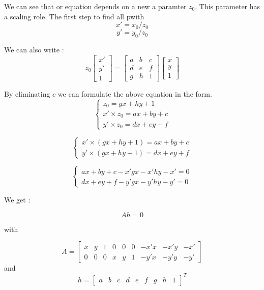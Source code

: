 \documentclass{article}
\begin{document}
 We can see that or equation depends on a new a paramter $z_0$. This parameter has a scaling role. The first step to find all pwith 
$$ x' = x_0 / z_0 $$
$$ y' = y_0 / z_0 $$

We can also write :
$$ z_0 \begin{bmatrix} x' \\ y' \\ 1 \end{bmatrix} = \begin{bmatrix} a & b & c \\ d & e & f \\ g & h & 1 \end{bmatrix} \begin{bmatrix} x \\ y \\ 1 \end{bmatrix} $$

By eliminating $c$ we can formulate the above equation in the form.
\begin{equation}
\left\lbrace
\begin{array}{ccc}
z_0 = gx + hy + 1 \\
x' \times z_0 = ax + by + c \\
y' \times z_0 = dx + ey + f
\end{array}\right.
\end{equation}

\begin{equation}
\left\lbrace
\begin{array}{ccc}
x' \times (gx + hy + 1) = ax + by + c \\
y' \times (gx + hy + 1) = dx + ey + f
\end{array}\right.
\end{equation}

\begin{equation}
\left\lbrace
\begin{array}{ccc}
ax + by + c  -  x'gx - x'hy - x' = 0\\
dx + ey + f - y'gx - y'hy - y' = 0
\end{array}\right.
\end{equation}

We get :

$$Ah = 0$$

with

$$ A = \begin{bmatrix} x & y & 1 & 0 & 0 & 0 & -x'x & -x'y & -x'  \\ 0 & 0 & 0 & x & y & 1 & -y'x & -y'y & -y' \end{bmatrix} $$
and
$$ h = \begin{bmatrix} a & b & c & d & e & f & g & h & 1  \end{bmatrix}^T $$
\end{document}
